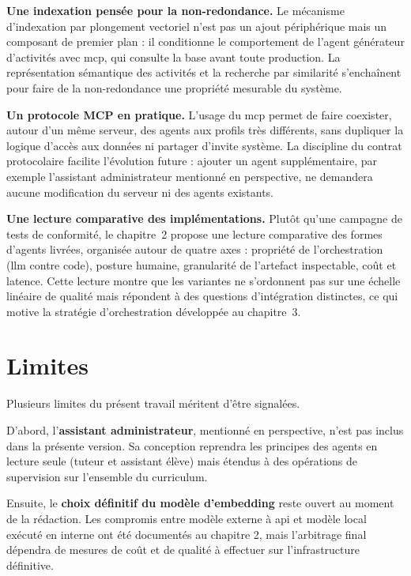 \textbf{Une indexation pensée pour la non-redondance.} Le
mécanisme d'indexation par plongement vectoriel n'est pas un
ajout périphérique mais un composant de premier plan : il
conditionne le comportement de l'agent générateur d'activités
avec \gls{mcp}, qui consulte la base avant toute production. La
représentation sémantique des activités et la recherche par
similarité s'enchaînent pour faire de la non-redondance une
propriété mesurable du système.

\textbf{Un protocole MCP en pratique.} L'usage du \gls{mcp}
permet de faire coexister, autour d'un même serveur, des agents
aux profils très différents, sans dupliquer la logique d'accès
aux données ni partager d'invite système. La discipline du contrat protocolaire
facilite l'évolution future : ajouter un agent supplémentaire,
par exemple l'assistant administrateur mentionné en perspective,
ne demandera aucune modification du serveur ni des agents
existants.

\textbf{Une lecture comparative des implémentations.}
Plutôt qu'une campagne de tests de conformité, le chapitre~2
propose une lecture comparative des formes d'agents livrées,
organisée autour de quatre axes : propriété de l'orchestration
(\gls{llm} contre code), posture humaine, granularité de
l'artefact inspectable, coût et latence. Cette lecture montre que
les variantes ne s'ordonnent pas sur une échelle linéaire de
qualité mais répondent à des questions d'intégration distinctes,
ce qui motive la stratégie d'orchestration développée au
chapitre~3.

\section*{Limites}

Plusieurs limites du présent travail méritent d'être signalées.

D'abord, l'\textbf{assistant administrateur}, mentionné en
perspective, n'est pas inclus dans la présente version. Sa
conception reprendra les principes des agents en lecture seule
(tuteur et assistant élève) mais étendus à des opérations de
supervision sur l'ensemble du curriculum.

Ensuite, le \textbf{choix définitif du modèle d'embedding} reste
ouvert au moment de la rédaction. Les compromis entre modèle
externe à \gls{api} et modèle local exécuté en interne ont été
documentés au chapitre 2, mais l'arbitrage final dépendra de
mesures de coût et de qualité à effectuer sur l'infrastructure
définitive.

